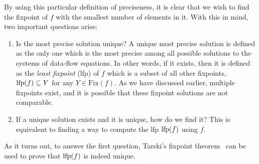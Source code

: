 By using this particular definition of preciseness, it is clear that we wish to
find the fixpoint of $f$ with the smallest number of elements in it.  With this
in mind, two important questions arise:
\begin{enumerate}

    \item Is the most precise solution unique?  A unique most precise solution
    is defined as the only one which is the most precise among all possible
    solutions to the systems of data-flow equations.  In other words, if it
    exists, then it is defined as the \emph{least fixpoint} (\gls{lfp}) of
    $f$ which is a subset of all other fixpoints, \ie~$\operatorname{\mathrm{lfp}} (f) \subseteq Y$
    for any $Y \in \mathrm{Fix}(f)$.  As we have discussed earlier, multiple
    fixpoints exist, and it is possible that these fixpoint solutions are not
    comparable.

    \item If a unique solution exists and it is unique, how do we find it?
    This is equivalent to finding a way to compute the \gls{lfp} $\operatorname{\mathrm{lfp}}(f)$
    using $f$.

\end{enumerate}

As it turns out, to answer the first question, Tarski's fixpoint
theorem~\cite{tarski55, nielson99} can be used to prove that $\operatorname{\mathrm{lfp}} (f)$ is
indeed unique.

